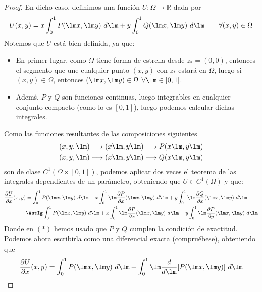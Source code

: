 \begin{teo}
\begin{proof}
        En dicho caso, definimos una función $U:\Omega\rightarrow\mathbb{R}$ dada por
        \begin{equation*}
            U(x,y) = x\int_{0}^{1} P(\lm x,\lm y)~d\lm + y\int_{0}^{1} Q(\lm x,\lm y)~d\lm  \qquad \forall (x,y)\in \Omega
        \end{equation*}
        Notemos que $U$ está bien definida, ya que: 
        \begin{itemize}
            \item En primer lugar, como $\Omega$ tiene forma de estrella desde $z_\ast = (0,0)$, entonces el segmento que une cualquier punto $(x,y)$ con $z_\ast$ estará en $\Omega$, luego si $(x,y)\in \Omega$, entonces $(\lm x,\lm y)\in \Omega$ $\forall \lm\in [0,1]$.
            \item Ademś, $P$ y $Q$ son funciones continuas, luego integrables en cualquier conjunto compacto (como lo es $[0,1]$), luego podemos calcular dichas integrales.
        \end{itemize}
        Como las funciones resultantes de las composiciones siguientes
        \begin{gather*}
            (x,y,\lm) \longmapsto (x\lm, y\lm) \longmapsto P(x\lm, y\lm) \\
            (x,y,\lm) \longmapsto (x\lm, y\lm) \longmapsto Q(x\lm, y\lm) 
        \end{gather*}
        son de clase $C^1(\Omega\times [0,1])$, podemos aplicar dos veces el teorema de las integrales dependientes de un parámetro, obteniendo que $U\in C^1(\Omega)$ y que:
        \begin{align*}
            \dfrac{\partial U}{\partial x}(x,y) &= \int_{0}^{1} P(\lm x,\lm y)~d\lm  + x\int_{0}^{1} \lm \dfrac{\partial P}{\partial x}(\lm x,\lm y)~d\lm  + y\int_{0}^{1} \lm\dfrac{\partial Q}{\partial x}(\lm x,\lm y)~d\lm  \\
                                                &\AstIg \int_{0}^{1} P(\lm x,\lm y)~d\lm  + x\int_{0}^{1} \lm \dfrac{\partial P}{\partial x}(\lm x,\lm y)~d\lm  + y\int_{0}^{1} \lm\dfrac{\partial P}{\partial y}(\lm x,\lm y)~d\lm  
        \end{align*}
        Donde en $(\ast)$ hemos usado que $P$ y $Q$ cumplen la condición de exactitud. Podemos ahora escribirla como una diferencial exacta (compruébese), obteniendo que
        \begin{equation*}
            \dfrac{\partial U}{\partial x}(x,y) = \int_{0}^{1} P(\lm x,\lm y)~d\lm  + \int_{0}^{1} \lm\dfrac{d}{d\lm}[P(\lm x,\lm y)]~d\lm 
        \end{equation*}

\end{proof}
\end{teo}
